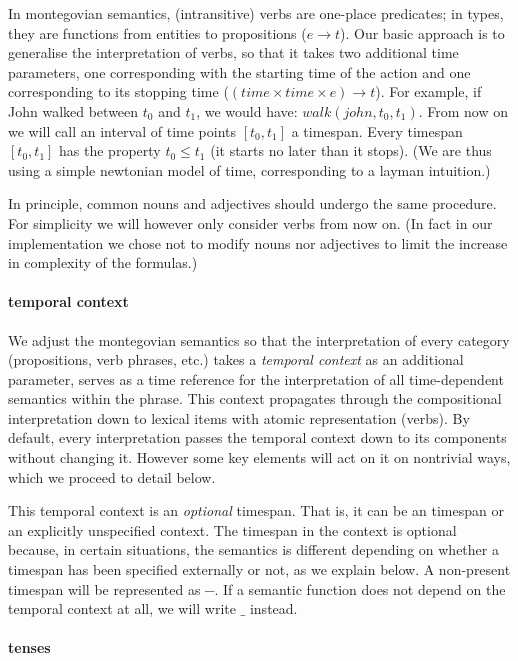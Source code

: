 \documentclass[a4paper,11pt]{article}
\begin{document}
In montegovian semantics, (intransitive) verbs are one-place
predicates; in types, they are functions from entities to propositions
($e \to t$).  Our basic approach is to generalise the interpretation of 
verbs, so that it takes two
additional time parameters, one corresponding with the starting time
of the action and one corresponding to its stopping time ($(time × time × e) \to t$). For example,
if John walked between $t_0$ and $t_1$, we would have:
$walk(john,t_0,t_1)$. From now on we will call an interval of time
points $[t_0,t_1]$ a timespan. Every timespan $[t_0,t_1]$ has the
property $t_0 ≤ t_1$ (it starts no later than it stops). (We are thus
using a simple newtonian model of time, corresponding to a layman
intuition.)

In principle, common nouns and adjectives should undergo the same
procedure. For simplicity we will however only consider verbs from now
on. (In fact in our implementation we chose not to modify nouns nor
adjectives to limit the increase in complexity of the formulas.)

\paragraph{temporal context}

We adjust the montegovian semantics so that the interpretation of
every category (propositions, verb phrases, etc.) takes a
\emph{temporal context} as an additional parameter, serves as a time
reference for the interpretation of all time-dependent semantics
within the phrase.  This context propagates through the compositional
interpretation down to lexical items with atomic representation
(verbs). By default, every interpretation passes the temporal context
down to its components without changing it. However some key elements
will act on it on nontrivial ways, which we proceed to detail below.

This temporal context is an \emph{optional} timespan. That is, it can
be an timespan or an explicitly unspecified context.
\newcommand\nospan{\ensuremath{─}}
\newcommand\anyspan{\ensuremath{\_}} The timespan in the context is
optional because, in certain situations, the semantics is different
depending on whether a timespan has been specified externally or not,
as we explain below. A non-present timespan will be represented as
\nospan{}. If a semantic function does not depend on the temporal
context at all, we will write \anyspan{} instead.

\paragraph{tenses}
\end{document}
